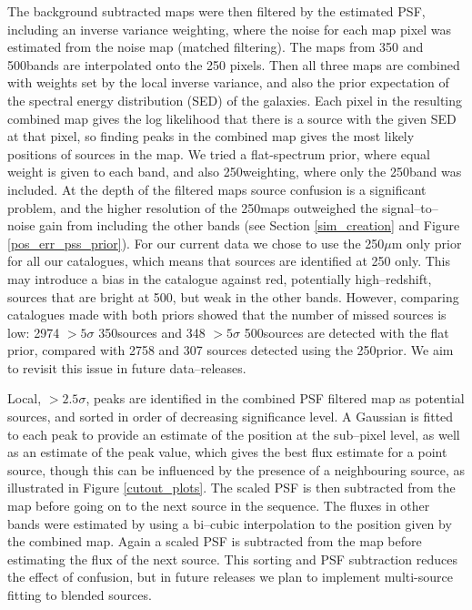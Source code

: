 The background subtracted maps were then filtered by the estimated
PSF, including an inverse variance weighting, where the noise for each
map pixel was estimated from the noise map (matched filtering).  The
maps from 350 and 500\mic bands are interpolated onto the 250\mic
pixels. Then all three maps are combined with weights set by the local
inverse variance, and also the prior expectation of the spectral
energy distribution (SED) of the galaxies. Each pixel in the resulting
combined map gives the log likelihood that there is a source with the
given SED at that pixel, so finding peaks in the combined map gives
the most likely positions of sources in the map. We tried a
flat-spectrum prior, where equal weight is given to each band, and
also 250\mic weighting, where only the 250\mic band was included. At
the depth of the filtered maps source confusion is a significant
problem, and the higher resolution of the 250\mic maps outweighed the
signal--to--noise gain from including the other bands (see Section
\ref{sim_creation} and Figure \ref{pos_err_pss_prior}). For our
current data we chose to use the 250$\mu $m only prior for all our
catalogues, which means that sources are identified at 250\mic
only. This may introduce a bias in the catalogue against red,
potentially high--redshift, sources that are bright at 500\mic, but
weak in the other bands. However, comparing catalogues made with both
priors showed that the number of missed sources is low: 2974
$>5\sigma$ 350\mic sources and 348 $>5\sigma$ 500\mic sources are
detected with the flat prior, compared with 2758 and 307 sources
detected using the 250\mic prior. We aim to revisit this issue in
future data--releases.

Local, $>2.5\sigma$, peaks are identified in the combined PSF filtered
map as potential sources, and sorted in order of decreasing
significance level. A Gaussian is fitted to each peak to provide an
estimate of the position at the sub--pixel level, as well as an
estimate of the peak value, which gives the best flux estimate for a
point source, though this can be influenced by the presence of a
neighbouring source, as illustrated in Figure \ref{cutout_plots}. The
scaled PSF is then subtracted from the map before going on to the next
source in the sequence.  The fluxes in other bands were estimated by
using a bi--cubic interpolation to the position given by the combined
map. Again a scaled PSF is subtracted from the map before estimating
the flux of the next source. This sorting and PSF subtraction reduces
the effect of confusion, but in future releases we plan to implement
multi-source fitting to blended sources.

